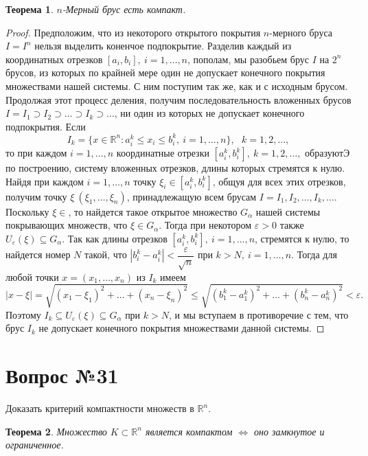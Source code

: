 \documentclass[12pt]{report}
\numberwithin{equation}{section}
\newtheorem{theorem}{Теорема}[section]
\begin{document}
\begin{theorem} \label{th:30:1}
$n$-Мерный брус есть компакт.
\end{theorem}
\begin{proof}
Предположим, что из некоторого открытого покрытия $n$-мерного бруса $I = I^n$ нельзя выделить коненчое подпокрытие. Разделив каждый из координатных отрезков $[a_i, b_i],~i = 1, \ldots, n$, пополам, мы разобьем брус $I$ на $2^n$ брусов, из которых по крайней мере один не допускает конечного покрытия множествами нашей системы. С ним поступим так же, как и с исходным брусом. Продолжая этот процесс деления, получим последовательность вложенных брусов $I = I_1 \supset I_2 \supset \ldots \supset I_k \supset \ldots$, ни один из которых не допускает конечного подпокрытия. Если
\[ I_k = \{ x \in \mathbb{R}^n : a_i^k \leqslant x_i \leqslant b_i^k, ~i = 1, \ldots, n\},~~~k = 1, 2 , \ldots, \]
то при каждом $i = 1, \ldots, n$ координатные отрезки $[a_i^k, b_i^k],~k = 1,2,\ldots,$ образуютЭ по построению, систему вложенных отрезков, длины которых стремятся к нулю. Найдя при каждом $i = 1, \ldots, n$ точку $\xi_i \in [a_i^k, b_i^k]$, общуя для всех этих отрезков, получим точку $\xi \ (\xi_1, \ldots, \xi_n)$, принадлежащую всем брусам $I = I_1, I_2, \ldots, I_k, \ldots$. Поскольку $\xi \in$, то найдется такое открытое множество $G_{\alpha}$ нашей системы покрывающих множеств, что $\xi \in G_{\alpha}$. Тогда при некотором $\varepsilon > 0$ также $U_{\varepsilon}(\xi) \subseteq G_{\alpha}$. Так как длины отрезков $[a_i^k, b_i^k],~i = 1, \ldots, n$, стремятся к нулю, то найдется номер $N$ такой, что $|b_i^k - a_i^k| < \dfrac{\varepsilon}{\sqrt{n}}$ при $k > N,~i = 1, \ldots, n$. Тогда для любой точки $x = (x_1, \ldots, x_n)$ из $I_k$ имеем
\[ |x - \xi| = \sqrt{(x_1 - \xi_1)^2 + \dots + (x_n - \xi_n)^2} \leqslant \sqrt{(b_1^k - a_1^k)^2 + \dots + (b_n^k - a_n^k)^2} < \varepsilon. \]
Поэтому $I_k \subseteq U_{\varepsilon}(\xi) \subseteq G_{\alpha}$ при $k > N$, и мы вступаем в противоречие с тем, что брус $I_k$ не допускает конечного покрытия множествами данной системы.
\end{proof}

\newpage \section{Вопрос №31} %
\begin{framed}
Доказать критерий компактности множеств в $\mathbb{R}^n$.
\end{framed}
\begin{theorem} \label{th:31:1}
Множество $K \subset \mathbb{R}^n$ является компактом $\iff$ оно замкнутое и ограниченное.
\end{theorem}
\end{document}
